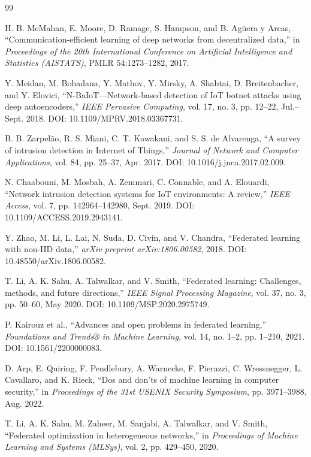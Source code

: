 \documentclass[11pt,a4paper]{article}
\begin{document}
\begin{thebibliography}{99}

 H. B. McMahan, E. Moore, D. Ramage, S. Hampson, and B. Agüera y Arcas, ``Communication-efficient learning of deep networks from decentralized data,'' in \textit{Proceedings of the 20th International Conference on Artificial Intelligence and Statistics (AISTATS)}, PMLR 54:1273–1282, 2017.

 Y. Meidan, M. Bohadana, Y. Mathov, Y. Mirsky, A. Shabtai, D. Breitenbacher, and Y. Elovici, ``N-BaIoT—Network-based detection of IoT botnet attacks using deep autoencoders,'' \textit{IEEE Pervasive Computing}, vol. 17, no. 3, pp. 12–22, Jul.–Sept. 2018. DOI: 10.1109/MPRV.2018.03367731.

 B. B. Zarpelão, R. S. Miani, C. T. Kawakani, and S. S. de Alvarenga, ``A survey of intrusion detection in Internet of Things,'' \textit{Journal of Network and Computer Applications}, vol. 84, pp. 25–37, Apr. 2017. DOI: 10.1016/j.jnca.2017.02.009.

 N. Chaabouni, M. Mosbah, A. Zemmari, C. Connable, and A. Elouardi, ``Network intrusion detection systems for IoT environments: A review,'' \textit{IEEE Access}, vol. 7, pp. 142964–142980, Sept. 2019. DOI: 10.1109/ACCESS.2019.2943141.

 Y. Zhao, M. Li, L. Lai, N. Suda, D. Civin, and V. Chandra, ``Federated learning with non-IID data,'' \textit{arXiv preprint arXiv:1806.00582}, 2018. DOI: 10.48550/arXiv.1806.00582.

 T. Li, A. K. Sahu, A. Talwalkar, and V. Smith, ``Federated learning: Challenges, methods, and future directions,'' \textit{IEEE Signal Processing Magazine}, vol. 37, no. 3, pp. 50–60, May 2020. DOI: 10.1109/MSP.2020.2975749.

 P. Kairouz et al., ``Advances and open problems in federated learning,'' \textit{Foundations and Trends® in Machine Learning}, vol. 14, no. 1–2, pp. 1–210, 2021. DOI: 10.1561/2200000083.

 D. Arp, E. Quiring, F. Pendlebury, A. Warnecke, F. Pierazzi, C. Wressnegger, L. Cavallaro, and K. Rieck, ``Dos and don'ts of machine learning in computer security,'' in \textit{Proceedings of the 31st USENIX Security Symposium}, pp. 3971–3988, Aug. 2022.

 T. Li, A. K. Sahu, M. Zaheer, M. Sanjabi, A. Talwalkar, and V. Smith, ``Federated optimization in heterogeneous networks,'' in \textit{Proceedings of Machine Learning and Systems (MLSys)}, vol. 2, pp. 429–450, 2020.


\end{thebibliography}
\end{document}
